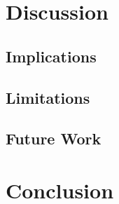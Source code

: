 \documentclass[10pt]{article}
\begin{document}
\section{Discussion}
\subsection{Implications}
\subsection{Limitations}
\subsection{Future Work}

\section{Conclusion}



\end{document}

